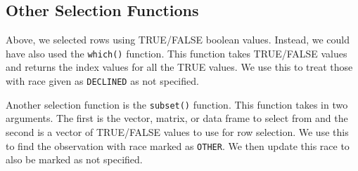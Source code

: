 \documentclass[
  letterpaper,
]{krantz}
\makeatletter
\newenvironment{Shaded}{\begin{snugshade}}{\end{snugshade}}
\newcommand{\FunctionTok}[1]{\textcolor[rgb]{0.28,0.35,0.67}{#1}}
\newcommand{\NormalTok}[1]{\textcolor[rgb]{0.00,0.23,0.31}{#1}}
\newcommand{\OtherTok}[1]{\textcolor[rgb]{0.00,0.23,0.31}{#1}}
\newcommand{\SpecialCharTok}[1]{\textcolor[rgb]{0.37,0.37,0.37}{#1}}
\newcommand{\StringTok}[1]{\textcolor[rgb]{0.13,0.47,0.30}{#1}}
\newenvironment{kframe}{%
\medskip{}
\setlength{\fboxsep}{.8em}
 \def\at@end@of@kframe{}%
 \ifinner\ifhmode%
  \def\at@end@of@kframe{\end{minipage}}%
  \begin{minipage}{\columnwidth}%
 \fi\fi%
 \def\FrameCommand##1{\hskip\@totalleftmargin \hskip-\fboxsep
 \colorbox{shadecolor}{##1}\hskip-\fboxsep
     \hskip-\linewidth \hskip-\@totalleftmargin \hskip\columnwidth}%
 \MakeFramed {\advance\hsize-\width
   \@totalleftmargin\z@ \linewidth\hsize
   \@setminipage}}%
 {\par\unskip\endMakeFramed%
 \at@end@of@kframe}
\renewenvironment{Shaded}{\begin{kframe}}{\end{kframe}}
\makeatother
\begin{document}
\subsection{Other Selection Functions}\label{other-selection-functions}

Above, we selected rows using TRUE/FALSE boolean values. Instead, we
could have also used the \texttt{which()} function. This function takes
TRUE/FALSE values and returns the index values for all the TRUE values.
We use this to treat those with race given as \texttt{DECLINED} as not
specified.

\begin{Shaded}
\end{Shaded}

Another selection function is the \texttt{subset()} function. This
function takes in two arguments. The first is the vector, matrix, or
data frame to select from and the second is a vector of TRUE/FALSE
values to use for row selection. We use this to find the observation
with race marked as \texttt{OTHER}. We then update this race to also be
marked as not specified.
\end{document}

